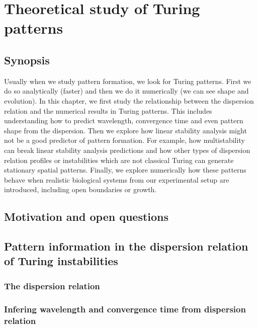 \chapter{Theoretical study of Turing patterns }
\section{Synopsis}
Usually when we study pattern formation, we look for Turing patterns.
First we do so analytically (faster) and then we do it numerically (we can see shape and evolution).
In this chapter, we first study the relationship between the dispersion relation and the numerical results in Turing patterns.
This includes understanding how to predict wavelength, convergence time and even pattern shape from the dispersion.
Then we explore how linear stability analysis might not be a good predictor of pattern formation.
For example, how multistability can break linear stability analysis predictions and how other types of dispersion relation profiles or instabilities which are not classical Turing can generate stationary spatial patterns.
Finally, we explore numerically how these patterns behave when realistic biological systems from our experimental setup are introduced, including open boundaries or growth.
\section{Motivation and open questions}




\section{Pattern information in the dispersion relation of Turing instabilities}

\subsection{The dispersion relation}

\subsection{Infering wavelength and convergence time from dispersion relation}


